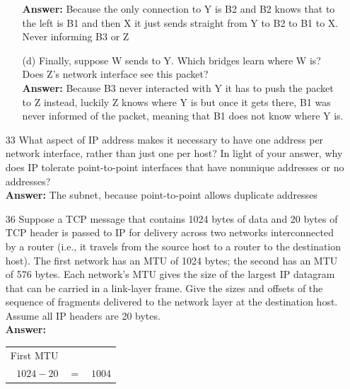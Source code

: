\documentclass[a4paper]{article}
\begin{document}
\begin{itemize}
\begin{itemize}
	      	      \textbf{Answer:} Because the only connection to Y is B2 and B2 knows that to the left is B1 and then X it just sends straight from Y to B2 to B1 to X. Never informing B3 or Z
	      	\item[(d)] Finally, suppose W sends to Y. Which bridges learn where W is? Does Z's network interface see this packet? \\
	      	      \textbf{Answer:} Because B3 never interacted with Y it has to push the packet to Z instead, luckily Z knows where Y is but once it gets there, B1 was never informed of the packet, meaning that B1 does not know where Y is.
	      \end{itemize} 
	\item[33] What aspect of IP address makes it necessary to have one address per network interface, rather than just one per host? In light of your answer, why does IP tolerate point-to-point interfaces that have nonunique addresses or no addresses? \\
	      \textbf{Answer:} The subnet, because point-to-point allows duplicate addresses
	\item[36] Suppose a TCP message that contains 1024 bytes of data and 20 bytes of TCP header is passed to IP for delivery across two networks interconnected by a router (i.e., it travels from the source host to a router to the destination host). The first network has an MTU of 1024 bytes; the second has an MTU of 576 bytes. Each network’s MTU gives the size of the largest IP datagram that can be carried in a link-layer frame. Give the sizes and offsets of the sequence of fragments delivered to the network layer at the destination host. Assume all IP headers are 20 bytes. \\
	      \textbf{Answer:} \\
	      \begin{tabular}{r c l}
	      	First MTU                   &     &        \\
	      	$1024 - 20$                 & $=$ & $1004$ \\

\end{tabular}
\end{itemize}
\end{document}
